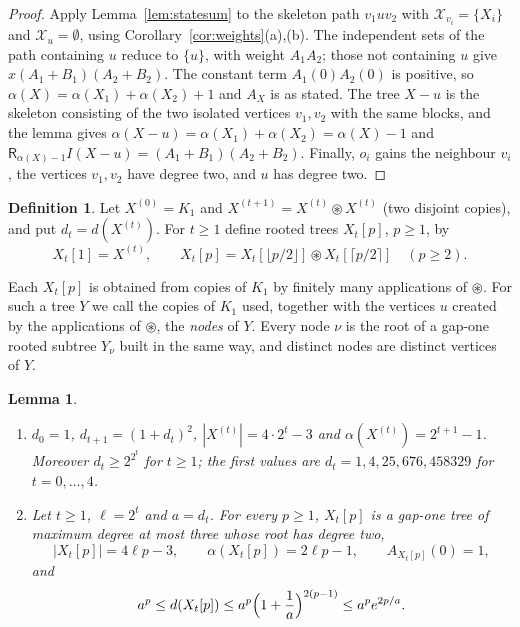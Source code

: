 \documentclass[11pt]{amsart}
\newtheorem{lemma}[theorem]{Lemma}
\theoremstyle{definition}
\newtheorem{definition}[theorem]{Definition}
\theoremstyle{remark}
\numberwithin{equation}{section}
\newcommand{\cX}{\mathcal{X}}
\newcommand{\R}{\mathsf{R}}
\newcommand{\cs}{\circledast}
\begin{document}
\begin{proof}
Apply Lemma~\ref{lem:statesum} to the skeleton path $v_1uv_2$ with $\cX_{v_i}=\{X_i\}$ and $\cX_u=\emptyset$, using Corollary~\ref{cor:weights}(a),(b). The independent sets of the path containing $u$ reduce to $\{u\}$, with weight $A_1A_2$; those not containing $u$ give $x(A_1+B_1)(A_2+B_2)$. The constant term $A_1(0)A_2(0)$ is positive, so $\alpha(X)=\alpha(X_1)+\alpha(X_2)+1$ and $A_X$ is as stated. The tree $X-u$ is the skeleton consisting of the two isolated vertices $v_1,v_2$ with the same blocks, and the lemma gives $\alpha(X-u)=\alpha(X_1)+\alpha(X_2)=\alpha(X)-1$ and $\R_{\alpha(X)-1}I(X-u)=(A_1+B_1)(A_2+B_2)$. Finally, $o_i$ gains the neighbour $v_i$, the vertices $v_1,v_2$ have degree two, and $u$ has degree two.
\end{proof}

\begin{definition}\label{def:blocks}
Let $X^{(0)}=K_1$ and $X^{(t+1)}=X^{(t)}\cs X^{(t)}$ (two disjoint copies), and put $d_t=d(X^{(t)})$. For $t\ge1$ define rooted trees $X_t[p]$, $p\ge1$, by
\[
X_t[1]=X^{(t)},\qquad X_t[p]=X_t[\lfloor p/2\rfloor]\cs X_t[\lceil p/2\rceil]\quad(p\ge2).
\]
\end{definition}

Each $X_t[p]$ is obtained from copies of $K_1$ by finitely many applications of $\cs$. For such a tree $Y$ we call the copies of $K_1$ used, together with the vertices $u$ created by the applications of $\cs$, the \emph{nodes} of $Y$. Every node $\nu$ is the root of a gap-one rooted subtree $Y_\nu$ built in the same way, and distinct nodes are distinct vertices of $Y$.

\begin{lemma}\label{lem:blocks}\leavevmode
\begin{enumerate}[label=\textup{(\roman*)}]
\item $d_0=1$, $d_{t+1}=(1+d_t)^2$, $|X^{(t)}|=4\cdot2^t-3$ and $\alpha(X^{(t)})=2^{t+1}-1$. Moreover $d_t\ge2^{2^t}$ for $t\ge1$; the first values are $d_t=1,4,25,676,458329$ for $t=0,\dots,4$.
\item Let $t\ge1$, $\ell=2^t$ and $a=d_t$. For every $p\ge1$, $X_t[p]$ is a gap-one tree of maximum degree at most three whose root has degree two,
\[
|X_t[p]|=4\ell p-3,\qquad\alpha(X_t[p])=2\ell p-1,\qquad A_{X_t[p]}(0)=1,
\]
and
\begin{equation}\label{eq:entropy}
a^p\le d(X_t[p])\le a^p\Bigl(1+\frac1a\Bigr)^{2(p-1)}\le a^pe^{2p/a}.
\end{equation}
\end{enumerate}
\end{lemma}
\end{document}
